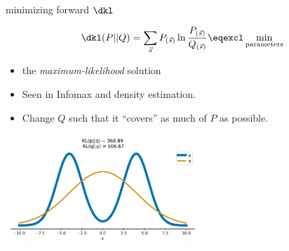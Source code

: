 \begin{frame}{\subsubsecname}

\begin{block}{minimizing forward $\dkl$}

\slidesonly{
\begingroup
\footnotesize
}
\begin{equation}
	\dkl(P||Q) = \sum\limits_{\vec{s}} P_{(\vec{s})} \ln \frac{P_{(\vec{s})}}{
		Q_{(\vec{s})}} \eqexcl \min_{\text{parameters}}
\end{equation}
\slidesonly{
\endgroup
}
\end{block}

\begin{itemize}
\item {}the \emph{maximum-likelihood} solution
\item Seen in Infomax and density estimation.
\item Change $Q$ such that it ``covers'' as much of $P$ as possible.
\end{itemize}

\pause

\begin{center}
	\includegraphics[width=0.55\textwidth]{img/kl_fwd}
\end{center}

\end{frame}

